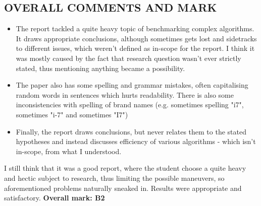 \documentclass{article}
\begin{document}
\begin{normalsize}
\section{OVERALL COMMENTS AND MARK}
\begin{itemize}
  \item The report tackled a quite heavy topic of benchmarking complex algorithms. It draws appropriate conclusions, although sometimes gets lost and sidetracks to different issues, which weren't defined as in-scope for the report. I think it was mostly caused by the fact that research question wasn't ever strictly stated, thus mentioning anything became a possibility.
  \item The paper also has some spelling and grammar mistakes, often capitalising random words in sentences which hurts readability. There is also some inconsistencies with spelling of brand names (e.g. sometimes spelling "i7", sometimes "i-7" and sometimes "I7") 
  \item Finally, the report draws conclusions, but never relates them to the stated hypotheses and instead discusses efficiency of various algorithms - which isn't in-scope, from what I understood.
\end{itemize}
I still think that it was a good report, where the student choose a quite heavy and hectic subject to research, thus limiting the possible maneuvers, so aforementioned problems naturally sneaked in. Results were appropriate and satisfactory.
\bigbreak\noindent
\textbf{Overall mark: B2}
\end{normalsize}
\end{document}
